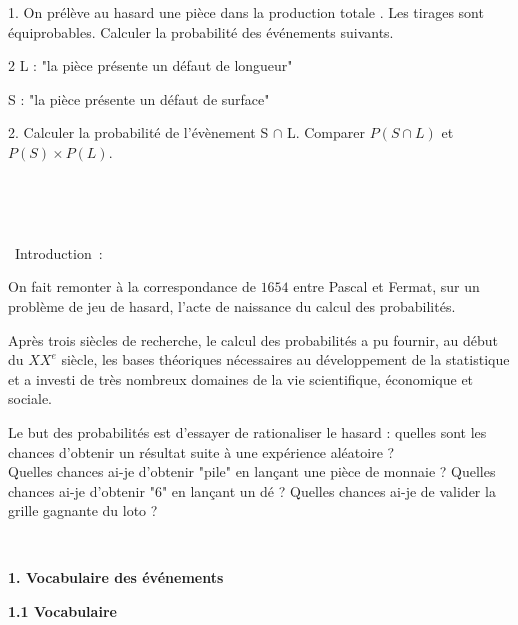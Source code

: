 \documentclass[11pt,a4paper]{article}
\newcommand{\intro}[1]
{\begin{bclogo}[couleur = white,logo=\bcinfo , arrondi = 0.1]
{~Introduction~:}
~~
{#1}
~~
\end{bclogo}}
\newcommand{\cadre}[1]
{\begin{bclogo}[couleur = white,logo=,  arrondi = 0.1,barre=none]
~~
{%
\rule{0mm}{#1mm}}\par
\medskip
~~
\end{bclogo}}
\newcommand{\cadreblanc}[1]{%
\medskip\framebox[\linewidth][c]{%
\rule{0mm}{#1mm}}\par
\medskip}
\begin{document}
1. On prélève au hasard une pièce dans la production totale . Les tirages sont équiprobables. Calculer la probabilité des événements suivants.
\begin{multicols}{2} 
	L : "la pièce présente un défaut de longueur"\\
	\cadreblanc{8}
	S : "la pièce présente un défaut de surface"\\
	\cadreblanc{8}
\end{multicols}
2. Calculer la probabilité de l'évènement S $\cap$ L. Comparer $P(S \cap L)$ et $P(S) \times P(L)$.\\
\cadre{-2}
\dotfill

\newpage
\intro{
On fait remonter à la correspondance de $1654$ entre Pascal et Fermat, sur un problème de jeu de hasard, l'acte de naissance du calcul des probabilités.

Après trois siècles de recherche, le calcul des probabilités a pu fournir, au début du $XX^{e}$ siècle, les bases théoriques nécessaires au développement de la statistique et a investi de très nombreux domaines de la vie scientifique, économique et sociale.

Le but des probabilités est d'essayer de rationaliser le hasard : quelles sont les chances d'obtenir un résultat suite à une expérience aléatoire ?\\
Quelles chances ai-je d'obtenir "pile" en lançant une pièce de monnaie ? Quelles chances ai-je d'obtenir "$6$" en lançant un dé ? Quelles chances ai-je de valider la grille gagnante du loto ?
}



\begin{mybox}
\begin{center}    
\textbf{1. Vocabulaire des événements}
\end{center}
\end{mybox}

\begin{mybox}
\begin{center}    
\textbf{1.1 Vocabulaire}
\end{center}
\end{mybox}
\end{document}
